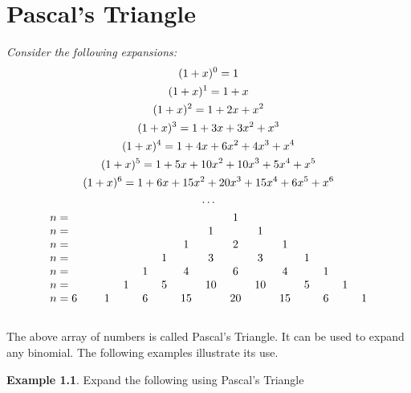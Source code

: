\documentclass[12pt, a4paper]{report}
\theoremstyle{definition}
\newtheorem{example}{Example}
\begin{document}
	\chapter{Pascal's Triangle}
	\bigskip
	\emph{Consider the following expansions:}
	\begin{gather*}
		(1+x)^0 = 1\\
		(1+x)^1 = 1+x\\
		(1+x)^2 = 1+2x+x^2\\
		(1+x)^3 = 1+3x+3x^2+x^3\\
		(1+x)^4 = 1+4x+6x^2+4x^3+x^4\\
		(1+x)^5 = 1+5x+10x^2+10x^3+5x^4+x^5\\
		(1+x)^6 = 1+6x+15x^2+20x^3+15x^4+6x^5+x^6\\
		\ldots\\
		\begin{tabular}{>{$n=}l<{$\hspace{12pt}}*{13}{c}}
			&   &   &   &   &    &    & 1  &    &    &   &   &   &   \\
			&   &   &   &   &    & 1  &    & 1  &    &   &   &   &   \\
			&   &   &   &   & 1  &    & 2  &    & 1  &   &   &   &   \\
			&   &   &   & 1 &    & 3  &    & 3  &    & 1 &   &   &   \\
			&   &   & 1 &   & 4  &    & 6  &    & 4  &   & 1 &   &   \\
			&   & 1 &   & 5 &    & 10 &    & 10 &    & 5 &   & 1 &   \\
			6 & 1 &   & 6 &   & 15 &    & 20 &    & 15 &   & 6 &   & 1 
		\end{tabular}
	\end{gather*}\\
	The above array of numbers is called Pascal's Triangle. It can be used to expand any binomial. The following examples illustrate its use.\\
	\newpage
	\begin{example}
		Expand the following using Pascal's Triangle
	\end{example}
\end{document}
